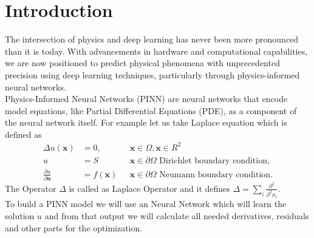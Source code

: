 \chapter{Introduction}
The intersection of physics and deep learning has never been more pronounced than it is today. With advancements in hardware and computational capabilities, we are now positioned to predict physical phenomena with unprecedented precision using deep learning techniques, particularly through physics-informed neural networks.\\
Physics-Informed Neural Networks (PINN) are neural networks  that encode model equations, like Partial Differential Equations (PDE), as a component of the neural network itself\cite{}. For example let us take Laplace equation which is defined as
\begin{eqnarray}
	\Delta u(\mathbf{x}) &= 0, &\texttt{   }\mathbf{x}\in \Omega,\mathbf{x}\in R^2\\
	u &= S &\texttt{   }\mathbf{x}\in \partial\Omega \text{     Dirichlet boundary condition},\\
	\frac{\partial u}{\partial \mathbf{n}} &= f(\mathbf{x}) &\texttt{   }\mathbf{x}\in \partial\Omega \text{     Neumann boundary condition}.
\end{eqnarray}
The Operator $\Delta$ is called as Laplace Operator and it defines $\Delta = \sum_i \frac{\partial^2}{\partial^2 x_i}.$\\
To build a PINN model we will use an Neural Network which will learn the solution $u$ and from that output we will calculate all needed derivatives, residuals and other parts for the optimization.

